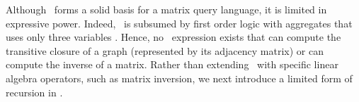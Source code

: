 


\noindent
Although \lang\ forms a solid basis for a matrix query language, it is limited in expressive power. Indeed, \lang\ is subsumed by first order logic with aggregates that uses only three variables \cite{matlang-journal}. 
Hence,
 no \lang\ expression exists that can compute the transitive closure of a graph (represented by its adjacency matrix) or can compute the inverse of a matrix. Rather than extending \lang\ with specific linear algebra operators, such as matrix inversion, we  
next introduce a limited form of recursion in \lang.

